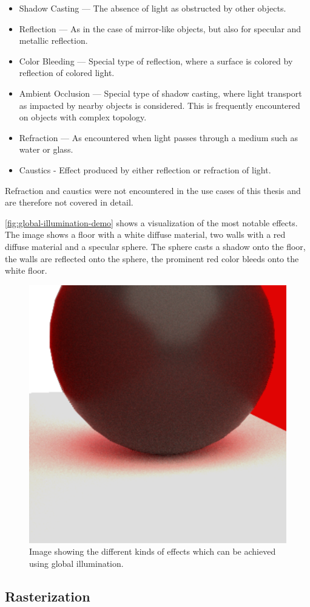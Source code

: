 \begin{itemize}
  \item{Shadow Casting} — The absence of light as obstructed by other objects.
  \item{Reflection} — As in the case of mirror-like objects, but also for specular and metallic reflection.
  \item{Color Bleeding} — Special type of reflection, where a surface is colored by reflection of colored light.
  \item{Ambient Occlusion} — Special type of shadow casting, where light transport as impacted by nearby objects is considered. This is frequently encountered on objects with complex topology.
  \item{Refraction} — As encountered when light passes through a medium such as water or glass.
  \item{Caustics} - Effect produced by either reflection or refraction of light.
\end{itemize}

Refraction and caustics were not encountered in the use cases of this thesis and are therefore not covered in detail.

\autoref{fig:global-illumination-demo} shows a visualization of the most notable effects. The image shows a floor with a white diffuse material, two walls with a red diffuse material and a specular sphere. The sphere casts a shadow onto the floor, the walls are reflected onto the sphere, the prominent red color bleeds onto the white floor.

\begin{figure}[H]
  \centering
  \includegraphics[width=0.3\columnwidth]{resources/global-illumination-demonstration.png}
  \caption{Image showing the different kinds of effects which can be achieved using global illumination.}
  \label{fig:global-illumination-demo}
\end{figure}

\subsection{Rasterization}
\label{ch:rasterizationTheory}

